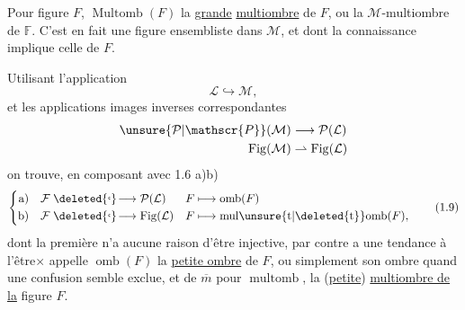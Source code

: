 
Pour  figure $F$, $\operatorname{Multomb}(F)$   la \uline{grande} \uline{multiombre} de $F$, ou la $\mathcal{M}$-multiombre de $\mathbb{F}$.  C'est en fait une figure ensembliste dans $\mathcal{M}$, et dont la connaissance implique celle de $F$.

 Utilisant   l'application
\[
\mathcal{L}\hookrightarrow\mathcal{M},
\]
et les applications images inverses correspondantes
\[
\begin{aligned}
\unsure{\mathcal{P}|\mathscr{P}}(\mathcal{M})&\longrightarrow\mathcal{P}(\mathcal{L})\\
\operatorname{Fig}(\mathcal{M})&\rightharpoonup\operatorname{Fig}(\mathcal{L})
\end{aligned}
\]
on trouve, en composant avec 1.6 a)b)
\[
\left\{\begin{aligned}
\text{a)}\quad \mathcal{F}&\mathrel{\deleted{\lhook}\!\longrightarrow}\mathcal{P}(\mathcal{L})&
 F&\longmapsto\operatorname{omb}(F)\\
\text{b)}\quad \mathcal{F}&\mathrel{\deleted{\lhook}\!\longrightarrow}\operatorname{Fig}(\mathcal{L})&
 F&\longmapsto\operatorname{mul\unsure{t|\deleted{t}}omb}(F),
\end{aligned}\right.\tag*{(1.9)}
\]
dont la première n'a aucune raison d'être injective,  par contre a une tendance à l'être$\times$   appelle $\operatorname{omb}(F)$ la \uline{petite ombre} de $F$, ou simplement son ombre quand une confusion semble exclue, et de $\overline m$ pour $\operatorname{multomb}$, la (\uline{petite}) \uline{multiombre de la} figure $F$.
